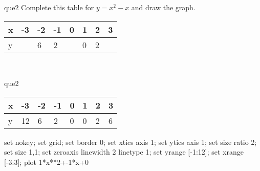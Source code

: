 \documentclass[13.5pt, varwidth=true]{beamer}
\begin{document}
\begin{frame}[shrink=19,fragile]
	\begin{beamercolorbox}[rounded=true, left, shadow=true,wd=14.8cm]{que2}
		 Complete this table for $y = x^{2} - x$ and draw the graph. \\[0.3cm] \renewcommand{\arraystretch}{1.2}\begin{tabular}{|C|C|C|C|C|C|C|C|} \hline x & -3 & -2 & -1 & 0 & 1 & 2 & 3 \\ \hline y &  & 6 & 2 &  & 0 & 2 & \\ \hline \end{tabular}\\[0.3cm]
	\end{beamercolorbox}
\end{frame}
\begin{frame}[shrink=19,fragile]
	\begin{beamercolorbox}[rounded=true, left, shadow=true,wd=14.8cm]{que2}
		\renewcommand{\arraystretch}{1.2}\begin{tabular}{|C|C|C|C|C|C|C|C|} \hline x & -3 & -2 & -1 & 0 & 1 & 2 & 3 \\ \hline y & 12 & 6 & 2 & 0 & 0 & 2 & 6\\ \hline \end{tabular}\begin{gnuplot}[terminal=pdf] set nokey; set grid; set border 0; set xtics axis 1; set ytics axis 1; set size ratio 2; set size 1,1; set zeroaxis linewidth 2 linetype 1; set yrange [-1:12]; set xrange [-3:3]; plot 1*x**2+-1*x+0 \end{gnuplot}
	\end{beamercolorbox}
\end{frame}
\end{document}
